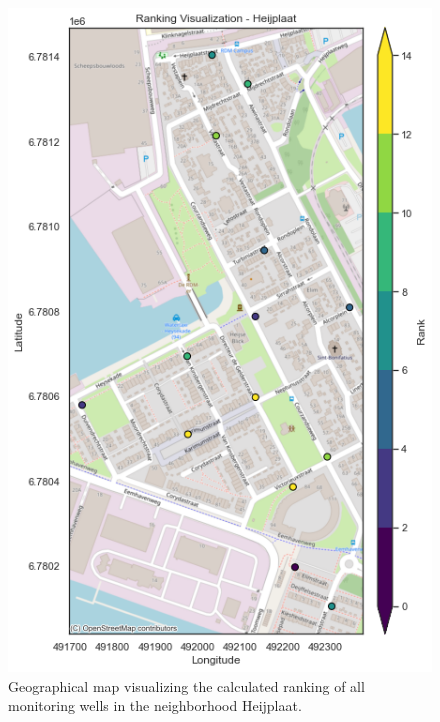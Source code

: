 \begin{figure}
    \centering
    \includegraphics[width=0.80\linewidth]{rankheij.png}
    \caption{Geographical map visualizing the calculated ranking of all monitoring wells in the neighborhood Heijplaat.}    
\end{figure}

\clearpage

